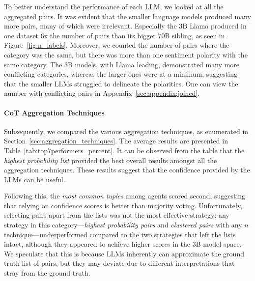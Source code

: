 \documentclass[11pt]{article}
\begin{document}
To better understand the performance of each LLM, we looked at all the aggregated pairs. It was evident that the smaller language models produced many more pairs, many of which were irrelevant. Especially the 3B Llama produced in one dataset 6x the number of pairs than its bigger 70B sibling, as seen in Figure~\ref{fig:n_labels}. Moreover, we counted the number of pairs where the category was the same, but there was more than one sentiment polarity with the same category. The 3B models, with Llama leading, demonstrated many more conflicting categories, whereas the larger ones were at a minimum, suggesting that the smaller LLMs struggled to delineate the polarities. One can view the number with conflicting pairs in Appendix~\ref{sec:appendix:joined}.





\paragraph{CoT Aggregation Techniques}

Subsequently, we compared the various aggregation techniques, as enumerated in Section~\ref{sec:aggregation_techniques}. The average results are presented in Table~\ref{tab:top7performers_percent}. It can be observed from the table that the \textit{highest probability list} provided the best overall results amongst all the aggregation techniques. These results suggest that the confidence provided by the LLMs can be useful. 

Following this, the \textit{most common tuples} among agents scored second, suggesting that relying on confidence scores is better than majority voting. Unfortunately, selecting pairs apart from the lists was not the most effective strategy: any strategy in this category—\textit{highest probability pairs} and \textit{clustered pairs} with any $n$ technique—underperformed compared to the two strategies that left the lists intact, although they appeared to achieve higher scores in the 3B model space. We speculate that this is because LLMs inherently can approximate the ground truth list of pairs, but they may deviate due to different interpretations that stray from the ground truth. 

\end{document}

